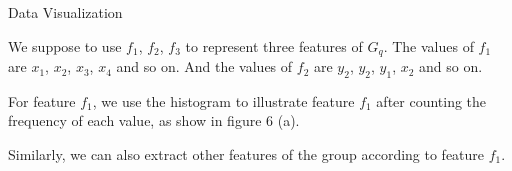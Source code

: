 \documentclass[
 size=14pt,
 paper=smartboard,  %
 mode=present, 		%
 display=slides, 	%
 style=tuliplab,  	%
 pauseslide,
 fleqn,leqno]{powerdot}
\begin{document}
\begin{slide}{Data Visualization}
\begin{note}
  We suppose to use $f_1$, $f_2$, $f_3$ to represent three features of $G_q$.
  The values of $f_1$ are {$x_1$, $x_2$, $x_3$, $x_4$} and so on.
  And the values of $f_2$ are {$y_2$, $y_2$, $y_1$, $x_2$} and so on.
  
  For feature $f_1$,
  we use the histogram to illustrate feature $f_1$ after
  counting the frequency of each value,
  as show in figure 6 (a).
  
  Similarly,
  we can also extract other features of the group
  according to feature $f_1$.
  \end{note}
  
  \end{slide}
\end{document}
